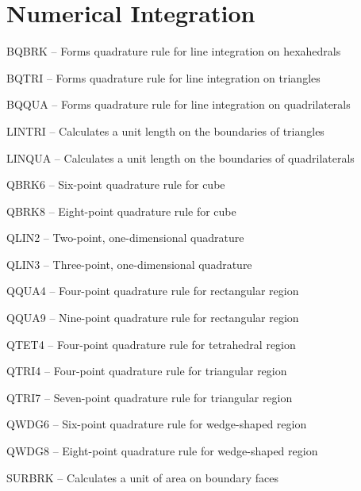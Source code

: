 \section{Numerical Integration}
\begin{list}{}{\leftmargin=57pt }
\item[BQBRK \hfill]  -- Forms quadrature rule for line integration on hexahedrals
\item[BQTRI \hfill]  -- Forms quadrature rule for line integration on triangles
\item[BQQUA \hfill]  -- Forms quadrature rule for line integration on quadrilaterals
\item[LINTRI \hfill] -- Calculates a unit length on the boundaries of triangles
\item[LINQUA \hfill] -- Calculates a unit length on the boundaries of quadrilaterals
\item[QBRK6 \hfill]  -- Six-point quadrature rule for cube
\item[QBRK8 \hfill]  -- Eight-point quadrature rule for cube
\item[QLIN2 \hfill]  -- Two-point, one-dimensional quadrature
\item[QLIN3 \hfill]  -- Three-point, one-dimensional quadrature
\item[QQUA4 \hfill]  -- Four-point quadrature rule for rectangular region
\item[QQUA9 \hfill]  -- Nine-point quadrature rule for rectangular region
\item[QTET4 \hfill]  -- Four-point quadrature rule for tetrahedral region
\item[QTRI4 \hfill]  -- Four-point quadrature rule for triangular region
\item[QTRI7 \hfill]  -- Seven-point quadrature rule for triangular region
\item[QWDG6 \hfill]  -- Six-point quadrature rule for wedge-shaped region
\item[QWDG8 \hfill]  -- Eight-point quadrature rule for wedge-shaped region
\item[SURBRK \hfill] -- Calculates a unit of area on boundary faces
\end{list}
